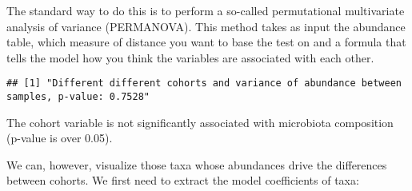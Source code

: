 \documentclass[
  oneside]{book}
\newenvironment{Shaded}{\begin{snugshade}}{\end{snugshade}}
\newcommand{\AttributeTok}[1]{\textcolor[rgb]{0.77,0.63,0.00}{#1}}
\newcommand{\CommentTok}[1]{\textcolor[rgb]{0.56,0.35,0.01}{\textit{#1}}}
\newcommand{\DecValTok}[1]{\textcolor[rgb]{0.00,0.00,0.81}{#1}}
\newcommand{\FunctionTok}[1]{\textcolor[rgb]{0.00,0.00,0.00}{#1}}
\newcommand{\NormalTok}[1]{#1}
\newcommand{\OtherTok}[1]{\textcolor[rgb]{0.56,0.35,0.01}{#1}}
\newcommand{\SpecialCharTok}[1]{\textcolor[rgb]{0.00,0.00,0.00}{#1}}
\newcommand{\StringTok}[1]{\textcolor[rgb]{0.31,0.60,0.02}{#1}}
\begin{document}
The standard way to do this is to perform a so-called permutational
multivariate analysis of variance (PERMANOVA). This method takes as
input the abundance table, which measure of distance you want to base
the test on and a formula that tells the model how you think the
variables are associated with each other.

\begin{Shaded}
\end{Shaded}

\begin{verbatim}
## [1] "Different different cohorts and variance of abundance between samples, p-value: 0.7528"
\end{verbatim}

The cohort variable is not significantly associated with
microbiota composition (p-value is over 0.05).

We can, however, visualize those taxa whose abundances drive the
differences between cohorts. We first need to extract the model
coefficients of taxa:
\end{document}
